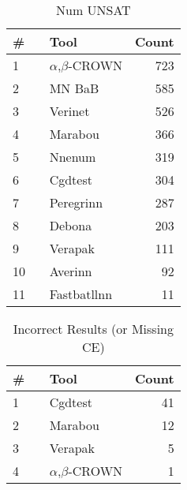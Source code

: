 
\begin{table}[h]
\begin{center}
\caption{Num UNSAT} \label{tab:stats3}
{\setlength{\tabcolsep}{2pt}
\begin{tabular}[h]{@{}llr@{}}
\toprule
\textbf{\# ~} & \textbf{Tool} & \textbf{Count}\\
\midrule
1 & $\alpha$,$\beta$-CROWN & 723 \\
2 & MN BaB & 585 \\
3 & Verinet & 526 \\
4 & Marabou & 366 \\
5 & Nnenum & 319 \\
6 & Cgdtest & 304 \\
7 & Peregrinn & 287 \\
8 & Debona & 203 \\
9 & Verapak & 111 \\
10 & Averinn & 92 \\
11 & Fastbatllnn & 11 \\
\bottomrule
\end{tabular}
}
\end{center}
\end{table}




\begin{table}[h]
\begin{center}
\caption{Incorrect Results (or Missing CE)} \label{tab:stats4}
{\setlength{\tabcolsep}{2pt}
\begin{tabular}[h]{@{}llr@{}}
\toprule
\textbf{\# ~} & \textbf{Tool} & \textbf{Count}\\
\midrule
1 & Cgdtest & 41 \\
2 & Marabou & 12 \\
3 & Verapak & 5 \\
4 & $\alpha$,$\beta$-CROWN & 1 \\
\bottomrule
\end{tabular}
}
\end{center}
\end{table}


